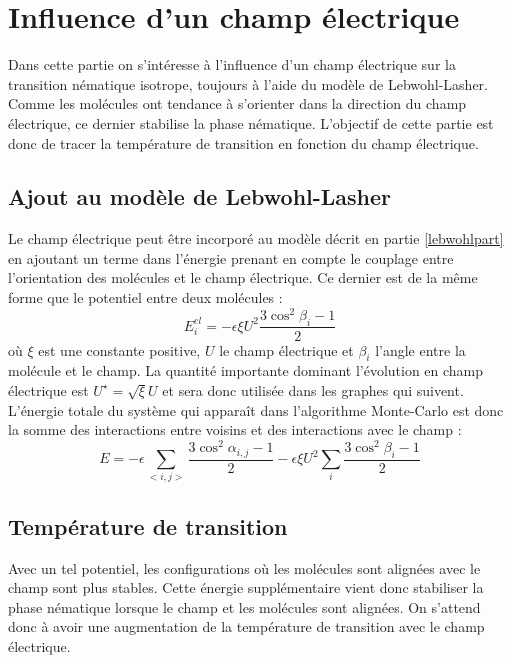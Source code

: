 \documentclass[11pt,a4paper]{article}
\numberwithin{equation}{section}
\begin{document}
\newpage
\section{Influence d'un champ électrique}


Dans cette partie on s'intéresse à l'influence d'un champ électrique sur la transition nématique isotrope, toujours à l'aide du modèle de Lebwohl-Lasher. Comme les molécules ont tendance à s'orienter dans la direction du champ électrique, ce dernier stabilise la phase nématique. L'objectif de cette partie est donc de tracer la température de transition en fonction du champ électrique.

\subsection{Ajout au modèle de Lebwohl-Lasher}
Le champ électrique peut être incorporé au modèle décrit en partie \ref{lebwohlpart} en ajoutant un terme dans l'énergie prenant en compte le couplage entre l'orientation des molécules et le champ électrique. Ce dernier est de la même forme que le potentiel entre deux molécules \cite{entropicelectric,electric3, biolo}:
\begin{equation}
E_{i}^{el} = - \epsilon \xi U^2 \frac{3\cos^2\beta_i-1}{2}
\label{interactfield}
\end{equation}
où $\xi$ est une constante positive, $U$ le champ électrique et $\beta_{i}$ l'angle entre la molécule et le champ. La quantité importante dominant l'évolution en champ électrique est $U^\star = \sqrt{\xi} U$ et sera donc utilisée dans les graphes qui suivent. L'énergie totale du système qui apparaît dans l'algorithme Monte-Carlo est donc la somme des interactions entre voisins et des interactions avec le champ :
\begin{equation}
E = - \epsilon\sum_{<i,j>} \frac{3\cos^2\alpha_{i,j}-1}{2} - \epsilon \xi U^2 \sum_{i}\frac{3\cos^2\beta_i-1}{2}
\end{equation}

\subsection{Température de transition}
Avec un tel potentiel, les configurations où les molécules sont alignées avec le champ sont plus stables. Cette énergie supplémentaire vient donc stabiliser la phase nématique lorsque le champ et les molécules sont alignées. On s'attend donc à avoir une augmentation de la température de transition avec le champ électrique.
\end{document}

